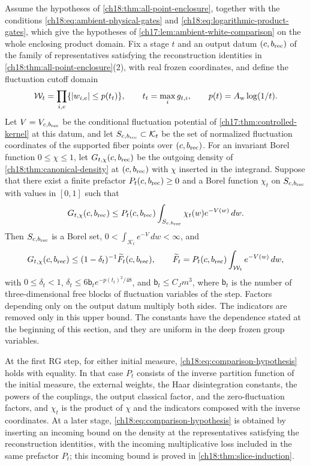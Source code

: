 \begin{lemma}\label{ch18:lem:enclosure-comparison}
Assume the hypotheses of \cref{ch18:thm:all-point-enclosure}, together with the conditions \eqref{ch18:eq:ambient-physical-gates} and \eqref{ch18:eq:logarithmic-product-gates}, which give the hypotheses of \cref{ch17:lem:ambient-white-comparison} on the whole enclosing product domain. Fix a stage $t$ and an output datum $(c,b_{\mathrm{rec}})$ of the family of representatives satisfying the reconstruction identities in \cref{ch18:thm:all-point-enclosure}(2), with real frozen coordinates, and define the fluctuation cutoff domain
\begin{equation}\label{ch18:eq:implemented-white-product}
 \mathcal W_t=\prod_{i,e}\{\lvert w_{i,e}\rvert\le p(t_t)\},\qquad
 t_t=\max_i g_{t,i},\qquad p(t)=A_{\mathrm w}\log(1/t).
\end{equation}
Let $V=V_{c,b_{\mathrm{rec}}}$ be the conditional fluctuation potential of \cref{ch17:thm:controlled-kernel} at this datum, and let $S_{c,b_{\mathrm{rec}}}\subset\mathcal K_t$ be the set of normalized fluctuation coordinates of the supported fiber points over $(c,b_{\mathrm{rec}})$. For an invariant Borel function $0\le\chi\le1$, let $G_{t,\chi}(c,b_{\mathrm{rec}})$ be the outgoing density of \cref{ch18:thm:canonical-density} at $(c,b_{\mathrm{rec}})$ with $\chi$ inserted in the integrand. Suppose that there exist a finite prefactor $P_t(c,b_{\mathrm{rec}})\ge0$ and a Borel function $\chi_t$ on $S_{c,b_{\mathrm{rec}}}$ with values in $[0,1]$ such that
\begin{equation}\label{ch18:eq:comparison-hypothesis}
 G_{t,\chi}(c,b_{\mathrm{rec}})\le P_t(c,b_{\mathrm{rec}})\int_{S_{c,b_{\mathrm{rec}}}}\chi_t(w)e^{-V(w)}\,dw.
\end{equation}
Then $S_{c,b_{\mathrm{rec}}}$ is a Borel set, $0<\int_{\mathcal K_t}e^{-V}\,dw<\infty$, and
\[
 G_{t,\chi}(c,b_{\mathrm{rec}})\le
       (1-\delta_t)^{-1}\widetilde F_t(c,b_{\mathrm{rec}}),\qquad
 \widetilde F_t=P_t(c,b_{\mathrm{rec}})\int_{\mathcal W_t}e^{-V(w)}\,dw,
\]
with $0\le\delta_t<1$, $\delta_t\le6\mathsf b_t e^{-p(t_t)^2/48}$, and $\mathsf b_t\le C_Jm^3$, where $\mathsf b_t$ is the number of three-dimensional free blocks of fluctuation variables of the step. Factors depending only on the output datum multiply both sides. The indicators are removed only in this upper bound. The constants have the dependence stated at the beginning of this section, and they are uniform in the deep frozen group variables.

At the first RG step, for either initial measure, \eqref{ch18:eq:comparison-hypothesis} holds with equality. In that case $P_t$ consists of the inverse partition function of the initial measure, the external weights, the Haar disintegration constants, the powers of the couplings, the output classical factor, and the zero-fluctuation factors, and $\chi_t$ is the product of $\chi$ and the indicators composed with the inverse coordinates. At a later stage, \eqref{ch18:eq:comparison-hypothesis} is obtained by inserting an incoming bound on the density at the representatives satisfying the reconstruction identities, with the incoming multiplicative loss included in the same prefactor $P_t$; this incoming bound is proved in \cref{ch18:thm:slice-induction}.
\end{lemma}

